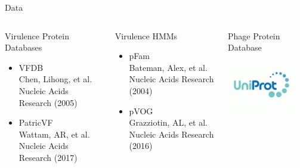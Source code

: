 \documentclass[11pt, xcolor=table]{beamer}
\begin{document}
	\begin{frame}{Data}
	\begin{columns}
	\begin{block}{Virulence Protein Databases}
		\begin{itemize}
			\item VFDB \\ \tiny{Chen, Lihong, et al. Nucleic Acids Research (2005)}
			\item \large{PatricVF} \\ \tiny{Wattam, AR, et al. Nucleic Acids Research (2017)}
		\end{itemize}
	\end{block}
	\begin{block}{Virulence HMMs}
	\begin{itemize}
		\item pFam \\ \tiny{Bateman, Alex, et al. Nucleic Acids Research (2004)}
		\item \large{pVOG} \\ \tiny{Grazziotin, AL, et al. Nucleic Acids Research (2016)}
	\end{itemize}
	\end{block}
	
	
	\begin{block}{Phage Protein Database}
	\includegraphics[height=3cm, width=3cm]{uniprot.png}
	\end{block}
	\end{columns}
	\end{frame}
\end{document}
